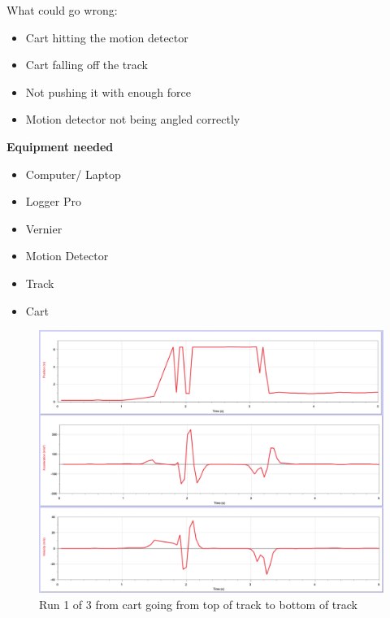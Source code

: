 \documentclass[idxtotoc,hyperref,openany]{labbook} %
\begin{document}
\hfill \break
What could go wrong:
\begin{itemize}
    \item Cart hitting the motion detector
    \item Cart falling off the track
    \item Not pushing it with enough force
    \item Motion detector not being angled correctly
\end{itemize}

\hfill \break
\textbf{Equipment needed}
\begin{itemize}
    \item Computer/ Laptop
    \item Logger Pro
    \item Vernier
    \item Motion Detector
    \item Track
    \item Cart
\end{itemize}


\newpage
{}
\vspace{-2in}
\begin{figure}[H] %
\begin{center}
\includegraphics[width=1\linewidth]{images/Lab.02/GoDown1.png}
\end{center}
\caption{Run 1 of 3 from cart going from top of track to bottom of track}
\label{fig:Data of Cart GoDown1}
\end{figure}
\end{document}
